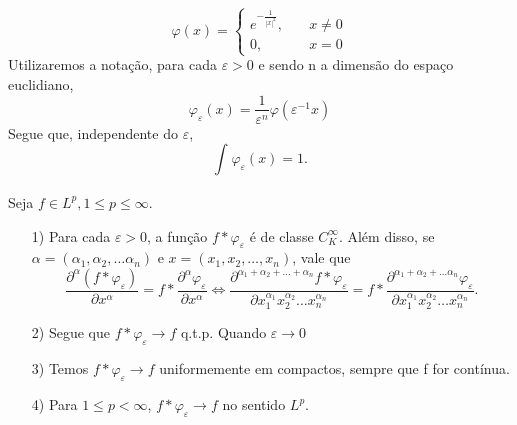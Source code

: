 \documentclass[MeasureTheory/measure_theory.tex]{subfiles}
\begin{document}
\[
	\varphi (x) = \left\{\begin{array}{ll}
		e^{-\frac{1}{|x|^{2}}},\quad & x\neq 0 \\
		0,\quad                      & x = 0
	\end{array}\right.
\]
Utilizaremos a notação, para cada \(\varepsilon  > 0\) e sendo n a dimensão do espaço euclidiano,
\[
	\varphi_{\varepsilon }(x) = \frac{1}{\varepsilon^{n} }\varphi (\varepsilon^{-1}x)
\]
Segue que, independente do \(\varepsilon \),
\[
	\int_{}^{}\varphi_{\varepsilon }(x) = 1.
\]
\begin{theorem*}
	Seja \(f\in L^{p}, 1\leq p\leq \infty\).
	\begin{itemize}
		\item[1)] Para cada \(\varepsilon > 0\), a função \(f*\varphi_{\varepsilon }\) é de classe \(C_{K}^{\infty}\). Além disso, se \(\alpha  = (\alpha_1, \alpha_2, \dotsc \alpha_n)\) e
		      \(x = (x_1, x_2, \dotsc , x_{n})\), vale que
		      \[
			      \frac{\partial^{\alpha }(f*\varphi_{\varepsilon })}{\partial x^{\alpha }} = f*\frac{\partial^{\alpha }\varphi_{\varepsilon }}{\partial x^{\alpha }} \Longleftrightarrow \frac{\partial^{\alpha_1 + \alpha_2 + \dotsc + \alpha_{n}}f*\varphi_{\varepsilon}}{\partial x_{1}^{\alpha_1}x_{2}^{\alpha_2}\dotsc x_{n}^{\alpha_{n}}} = f* \frac{\partial^{\alpha_1 + \alpha_2 + \dotsc \alpha_{n}}\varphi_{\varepsilon }}{\partial x_1^{\alpha_1}x_{2}^{\alpha_2}\dotsc x_{n}^{\alpha_{n}}}.
		      \]
		\item[2)] Segue que \(f*\varphi_{\varepsilon }\to f\) q.t.p. Quando \(\varepsilon \to 0\)
		\item[3)] Temos \(f*\varphi_{\varepsilon }\to f\) uniformemente em compactos, sempre que f for contínua.
		\item[4)] Para \(1\leq p < \infty\), \(f*\varphi_\varepsilon \to f\) no sentido \(L^{p}.\)
	\end{itemize}
\end{theorem*}
\end{document}
